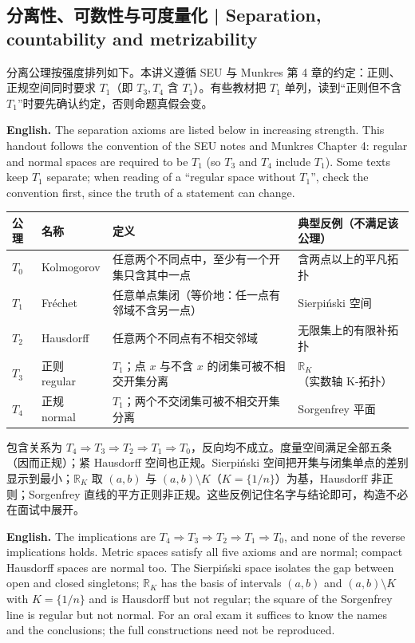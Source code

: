 \documentclass[UTF8,11pt,a4paper]{ctexart}
\newcommand{\EN}[1]{\par\noindent\textbf{English.} #1\par}
\begin{document}
\subsection{分离性、可数性与可度量化 | Separation, countability and metrizability}
\noindent 分离公理按强度排列如下。本讲义遵循 SEU 与 Munkres 第 4 章的约定：正则、正规空间同时要求 $T_1$（即 $T_3,T_4$ 含 $T_1$）。有些教材把 $T_1$ 单列，读到“正则但不含 $T_1$”时要先确认约定，否则命题真假会变。
\EN{The separation axioms are listed below in increasing strength. This handout follows the convention of the SEU notes and Munkres Chapter 4: regular and normal spaces are required to be $T_1$ (so $T_3$ and $T_4$ include $T_1$). Some texts keep $T_1$ separate; when reading of a ``regular space without $T_1$'', check the convention first, since the truth of a statement can change.}

{\footnotesize
\begin{center}
\begin{tabular}{p{0.8cm}p{2.3cm}p{7.7cm}p{3.6cm}}
\toprule
公理 & 名称 & 定义 & 典型反例（不满足该公理）\\
\midrule
$T_0$ & Kolmogorov & 任意两个不同点中，至少有一个开集只含其中一点 & 含两点以上的平凡拓扑\\
$T_1$ & Fr\'echet & 任意单点集闭（等价地：任一点有邻域不含另一点） & Sierpi\'nski 空间\\
$T_2$ & Hausdorff & 任意两个不同点有不相交邻域 & 无限集上的有限补拓扑\\
$T_3$ & 正则 regular & $T_1$；点 $x$ 与不含 $x$ 的闭集可被不相交开集分离 & $\mathbb R_K$（实数轴 K-拓扑）\\
$T_4$ & 正规 normal & $T_1$；两个不交闭集可被不相交开集分离 & Sorgenfrey 平面\\
\bottomrule
\end{tabular}
\end{center}
}
\noindent 包含关系为 $T_4\Rightarrow T_3\Rightarrow T_2\Rightarrow T_1\Rightarrow T_0$，反向均不成立。度量空间满足全部五条（因而正规）；紧 Hausdorff 空间也正规。Sierpi\'nski 空间把开集与闭集单点的差别显示到最小；$\mathbb R_K$ 取 $(a,b)$ 与 $(a,b)\setminus K$（$K=\{1/n\}$）为基，Hausdorff 非正则；Sorgenfrey 直线的平方正则非正规。这些反例记住名字与结论即可，构造不必在面试中展开。
\EN{The implications are $T_4\Rightarrow T_3\Rightarrow T_2\Rightarrow T_1\Rightarrow T_0$, and none of the reverse implications holds. Metric spaces satisfy all five axioms and are normal; compact Hausdorff spaces are normal too. The Sierpi\'nski space isolates the gap between open and closed singletons; $\mathbb R_K$ has the basis of intervals $(a,b)$ and $(a,b)\setminus K$ with $K=\{1/n\}$ and is Hausdorff but not regular; the square of the Sorgenfrey line is regular but not normal. For an oral exam it suffices to know the names and the conclusions; the full constructions need not be reproduced.}
\end{document}
